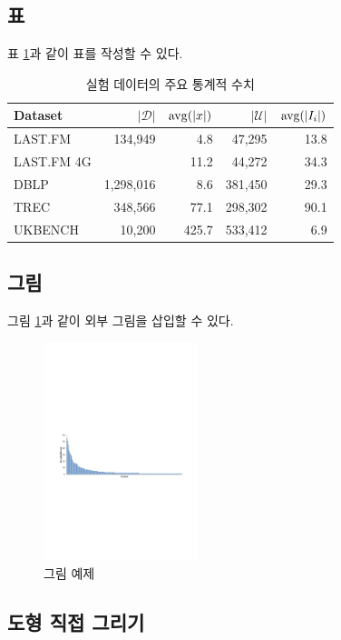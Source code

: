 \documentclass{kcc}
\begin{document}
\subsection{표}
표 \ref{tab:datasets}과 같이 표를 작성할 수 있다.
\begin{table}[!ht]
\centering
\setlength{\belowcaptionskip}{5pt}
\caption{실험 데이터의 주요 통계적 수치}
\label{tab:datasets}
\begin{tabular}{@{}lrrrr@{}} 
\toprule
{\bfseries Dataset} & $|\mathcal{D}|$ & ${\rm avg}(|x|)$ & $|\mathcal{U}|$ & ${\rm avg}(|I_i|)$ \\
\midrule
LAST.FM			&134,949	&  4.8	& 47,295	& 13.8\\
LAST.FM 4G		&			& 11.2	& 44,272	& 34.3\\
DBLP			&1,298,016	&  8.6	&381,450	& 29.3\\
TREC			&348,566	& 77.1	&298,302	& 90.1\\
UKBENCH			&10,200		&425.7	&533,412	&  6.9\\
\bottomrule
\end{tabular}
\end{table}


\subsection{그림}

그림 \ref{fig:example1}과 같이 외부 그림을 삽입할 수 있다.

\begin{figure}[!ht]
\centering
\includegraphics[width=0.4\textwidth]{graph/features.pdf}
\caption{그림 예제}
\label{fig:example1}
\end{figure}


\subsection{도형 직접 그리기}
\end{document}
